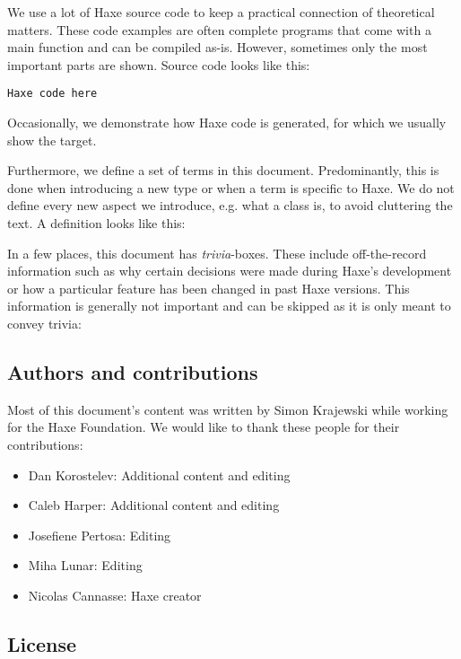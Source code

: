 We use a lot of Haxe source code to keep a practical connection of theoretical matters. These code examples are often complete programs that come with a main function and can be compiled as-is. However, sometimes only the most important parts are shown.
Source code looks like this:

\begin{lstlisting}
Haxe code here
\end{lstlisting}
Occasionally, we demonstrate how Haxe code is generated, for which we usually show the  target.

Furthermore, we define a set of terms in this document. Predominantly, this is done when introducing a new type or when a term is specific to Haxe. We do not define every new aspect we introduce, e.g. what a class is, to avoid cluttering the text. A definition looks like this:


In a few places, this document has \emph{trivia}-boxes. These include off-the-record information such as why certain decisions were made during Haxe's development or how a particular feature has been changed in past Haxe versions. This information is generally not important and can be skipped as it is only meant to convey trivia:


\subsection{Authors and contributions}
\label{introduction-authors-and-contributions}

Most of this document's content was written by Simon Krajewski while working for the Haxe Foundation. We would like to thank these people for their contributions:

\begin{itemize}
	\item Dan Korostelev: Additional content and editing
	\item Caleb Harper: Additional content and editing
	\item Josefiene Pertosa: Editing
	\item Miha Lunar: Editing
	\item Nicolas Cannasse: Haxe creator
\end{itemize}

\subsection{License}
\label{introduction-license}

